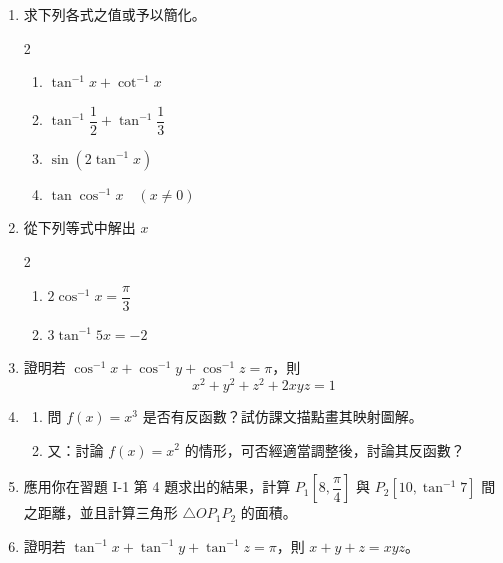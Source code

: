 \begin{enumerate}[label=\arabic*., topsep=4pt, itemsep=6pt]
  \item 求下列各式之值或予以簡化。
  \begin{multicols}{2}
  \begin{enumerate}[label=(\alph*), topsep=2pt, itemsep=4pt]
    \item $\tan^{-1} x + \cot^{-1} x$
    \item $\tan^{-1} \dfrac{1}{2} + \tan^{-1} \dfrac{1}{3}$
    \item $\sin(2 \tan^{-1} x)$
    \item $\tan \cos^{-1} x \quad (x \ne 0)$
  \end{enumerate}
  \end{multicols}

  \item 從下列等式中解出 $x$
  \begin{multicols}{2}
  \begin{enumerate}[label=(\alph*), topsep=2pt, itemsep=4pt]
    \item $2 \cos^{-1} x = \dfrac{\pi}{3}$
    \item $3 \tan^{-1} 5x = -2$
  \end{enumerate}
  \end{multicols}

  \item 證明若 $\cos^{-1} x + \cos^{-1} y + \cos^{-1} z = \pi$，則
  \[
  x^2 + y^2 + z^2 + 2xyz = 1
  \]

  \item
  \begin{enumerate}[label=(\roman*), topsep=2pt, itemsep=2pt]
    \item 問 $f(x) = x^3$ 是否有反函數？試仿課文描點畫其映射圖解。
    \item 又：討論 $f(x) = x^2$ 的情形，可否經適當調整後，討論其反函數？
  \end{enumerate}

  \item 應用你在習題 I-1 第 4 題求出的結果，計算
  $P_1\left[8, \dfrac{\pi}{4}\right]$ 與 $P_2\left[10, \tan^{-1} 7\right]$ 間之距離，並且計算三角形 $\triangle O P_1 P_2$ 的面積。

  \item 證明若 $\tan^{-1} x + \tan^{-1} y + \tan^{-1} z = \pi$，則 $x + y + z = xyz$。


\end{enumerate}
